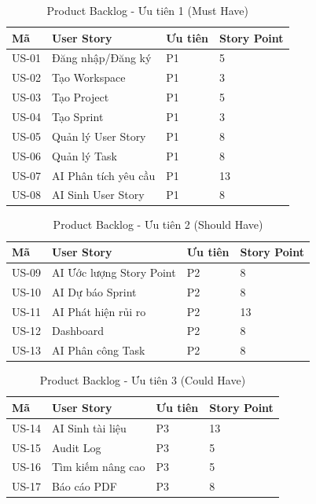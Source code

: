 \documentclass[12pt,a4paper]{report}
\begin{document}
\begin{table}[H]
\centering
\caption{Product Backlog - Ưu tiên 1 (Must Have)}
\begin{tabular}{|p{2cm}|p{4cm}|p{3cm}|p{3cm}|}
\hline
\textbf{Mã} & \textbf{User Story} & \textbf{Ưu tiên} & \textbf{Story Point} \\
\hline
US-01 & Đăng nhập/Đăng ký & P1 & 5 \\
\hline
US-02 & Tạo Workspace & P1 & 3 \\
\hline
US-03 & Tạo Project & P1 & 5 \\
\hline
US-04 & Tạo Sprint & P1 & 3 \\
\hline
US-05 & Quản lý User Story & P1 & 8 \\
\hline
US-06 & Quản lý Task & P1 & 8 \\
\hline
US-07 & AI Phân tích yêu cầu & P1 & 13 \\
\hline
US-08 & AI Sinh User Story & P1 & 8 \\
\hline
\end{tabular}
\label{tab:product_backlog_p1}
\end{table}

\begin{table}[H]
\centering
\caption{Product Backlog - Ưu tiên 2 (Should Have)}
\begin{tabular}{|p{2cm}|p{4cm}|p{3cm}|p{3cm}|}
\hline
\textbf{Mã} & \textbf{User Story} & \textbf{Ưu tiên} & \textbf{Story Point} \\
\hline
US-09 & AI Ước lượng Story Point & P2 & 8 \\
\hline
US-10 & AI Dự báo Sprint & P2 & 8 \\
\hline
US-11 & AI Phát hiện rủi ro & P2 & 13 \\
\hline
US-12 & Dashboard & P2 & 8 \\
\hline
US-13 & AI Phân công Task & P2 & 8 \\
\hline
\end{tabular}
\label{tab:product_backlog_p2}
\end{table}

\begin{table}[H]
\centering
\caption{Product Backlog - Ưu tiên 3 (Could Have)}
\begin{tabular}{|p{2cm}|p{4cm}|p{3cm}|p{3cm}|}
\hline
\textbf{Mã} & \textbf{User Story} & \textbf{Ưu tiên} & \textbf{Story Point} \\
\hline
US-14 & AI Sinh tài liệu & P3 & 13 \\
\hline
US-15 & Audit Log & P3 & 5 \\
\hline
US-16 & Tìm kiếm nâng cao & P3 & 5 \\
\hline
US-17 & Báo cáo PDF & P3 & 8 \\
\hline
\end{tabular}
\label{tab:product_backlog_p3}
\end{table}
\end{document}
